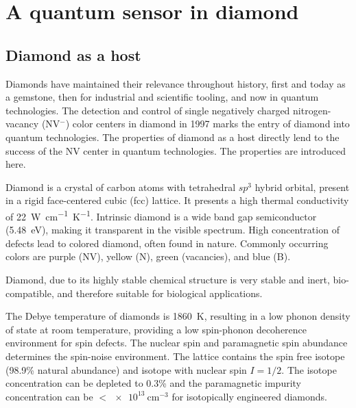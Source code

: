 \chapter{A quantum sensor in diamond}\label{sec:nvc_diamond}

\section{Diamond as a host}
Diamonds have maintained their relevance throughout history, first and today as a gemstone, then for industrial and scientific tooling, and now in quantum technologies\cite{markhamDiamondQuantumRevolution2020}. The detection and control of single negatively charged nitrogen-vacancy (\gls{NV}$^-$)\cite{gruberScanningConfocalOptical1997} color centers in diamond in 1997 marks the entry of diamond into quantum technologies\cite{dohertyNitrogenvacancyColourCentre2013}. The properties of diamond as a host directly lend to the success of the \gls{NV} center in quantum technologies. The properties are introduced here.

Diamond is a crystal of carbon atoms with tetrahedral $sp^3$ hybrid orbital, present in a rigid face-centered cubic (fcc) lattice. It presents a high thermal conductivity of \qty{22}{\watt\centi\meter^{-1}\kelvin^{-1}}. Intrinsic diamond is a wide band gap semiconductor (\qty{5.48}{\electronvolt}), making it transparent in the visible spectrum. High concentration of defects lead to colored diamond, often found in nature. Commonly occurring colors are purple (\gls{NV}), yellow (N), green (vacancies), and blue (B)\cite{DiamondsNatureGuide,mildrenIntrinsicOpticalProperties2013}.

Diamond, due to its highly stable chemical structure is very stable and inert, bio-compatible, and therefore suitable for biological applications\cite{wuDiamondQuantumDevices2016}.

The Debye temperature of diamonds is \qty{1860}{\kelvin}, resulting in a low phonon density of state at room temperature, providing a low spin-phonon decoherence environment for spin defects. The nuclear spin and paramagnetic spin abundance determines the spin-noise  environment. The lattice contains the spin free  isotope (98.9\% natural abundance) and  isotope with nuclear spin $I=1/2$. The  isotope concentration can be depleted to 0.3\% and the paramagnetic impurity concentration can be $<\qty{e13}{\centi\meter^{-3}}$ for isotopically engineered diamonds\cite{balasubramanianUltralongSpinCoherence2009}.

